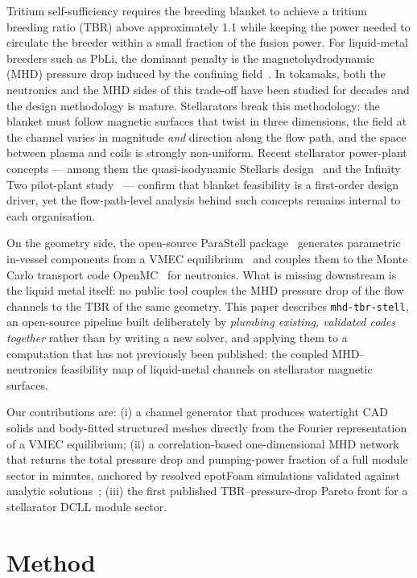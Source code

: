 \documentclass{article}
\begin{document}
Tritium self-sufficiency requires the breeding blanket to achieve a tritium breeding
ratio (TBR) above approximately 1.1 while keeping the power needed to circulate the
breeder within a small fraction of the fusion power. For liquid-metal breeders such
as PbLi, the dominant penalty is the magnetohydrodynamic (MHD) pressure drop induced
by the confining field~\cite{smolentsev2010}. In tokamaks, both the neutronics and
the MHD sides of this trade-off have been studied for decades and the design
methodology is mature. Stellarators break this methodology: the blanket must follow
magnetic surfaces that twist in three dimensions, the field at the channel varies in
magnitude \emph{and} direction along the flow path, and the space between plasma and
coils is strongly non-uniform. Recent stellarator power-plant concepts --- among them
the quasi-isodynamic Stellaris design~\cite{lion2025stellaris} and the Infinity Two
pilot-plant study~\cite{infinitytwo2025} --- confirm that blanket feasibility is a
first-order design driver, yet the flow-path-level analysis behind such concepts
remains internal to each organisation.

On the geometry side, the open-source ParaStell package~\cite{moreno2024parastell}
generates parametric in-vessel components from a VMEC
equilibrium~\cite{hirshman1983} and couples them to the Monte Carlo transport code
OpenMC~\cite{romano2015} for neutronics. What is missing downstream is the liquid
metal itself: no public tool couples the MHD pressure drop of the flow channels to
the TBR of the same geometry. This paper describes \texttt{mhd-tbr-stell}, an
open-source pipeline built deliberately by \emph{plumbing existing, validated codes
together} rather than by writing a new solver, and applying them to a computation
that has not previously been published: the coupled MHD--neutronics feasibility map
of liquid-metal channels on stellarator magnetic surfaces.

Our contributions are:
(i) a channel generator that produces watertight CAD solids and body-fitted
structured meshes directly from the Fourier representation of a VMEC equilibrium;
(ii) a correlation-based one-dimensional MHD network that returns the total pressure
drop and pumping-power fraction of a full module sector in minutes, anchored by
resolved epotFoam simulations validated against analytic
solutions~\cite{hartmann1937,shercliff1953,hunt1965};
(iii) the first published TBR--pressure-drop Pareto front for a stellarator DCLL
module sector.

\section{Method}
\end{document}
